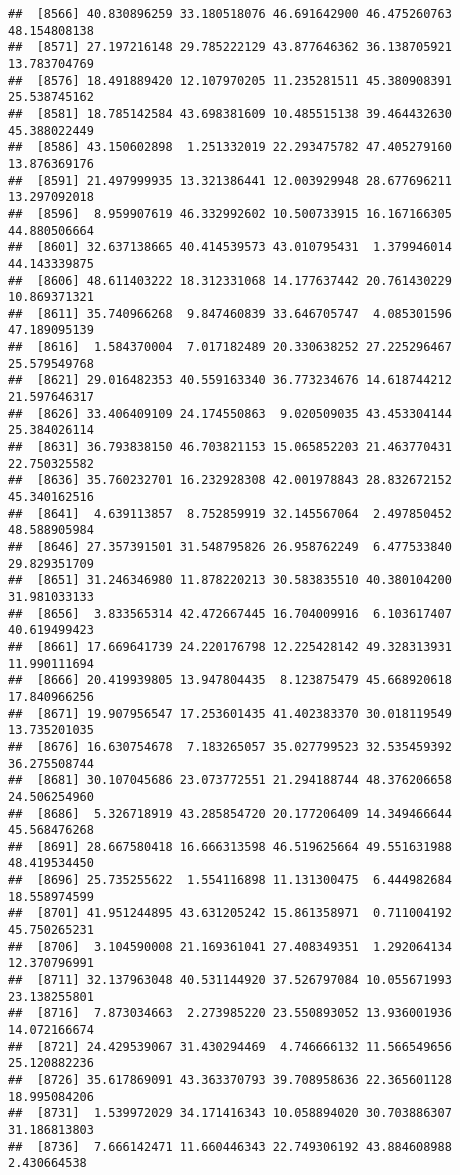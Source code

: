 \documentclass[
]{article}
\begin{document}
\begin{verbatim}
##  [8566] 40.830896259 33.180518076 46.691642900 46.475260763 48.154808138
##  [8571] 27.197216148 29.785222129 43.877646362 36.138705921 13.783704769
##  [8576] 18.491889420 12.107970205 11.235281511 45.380908391 25.538745162
##  [8581] 18.785142584 43.698381609 10.485515138 39.464432630 45.388022449
##  [8586] 43.150602898  1.251332019 22.293475782 47.405279160 13.876369176
##  [8591] 21.497999935 13.321386441 12.003929948 28.677696211 13.297092018
##  [8596]  8.959907619 46.332992602 10.500733915 16.167166305 44.880506664
##  [8601] 32.637138665 40.414539573 43.010795431  1.379946014 44.143339875
##  [8606] 48.611403222 18.312331068 14.177637442 20.761430229 10.869371321
##  [8611] 35.740966268  9.847460839 33.646705747  4.085301596 47.189095139
##  [8616]  1.584370004  7.017182489 20.330638252 27.225296467 25.579549768
##  [8621] 29.016482353 40.559163340 36.773234676 14.618744212 21.597646317
##  [8626] 33.406409109 24.174550863  9.020509035 43.453304144 25.384026114
##  [8631] 36.793838150 46.703821153 15.065852203 21.463770431 22.750325582
##  [8636] 35.760232701 16.232928308 42.001978843 28.832672152 45.340162516
##  [8641]  4.639113857  8.752859919 32.145567064  2.497850452 48.588905984
##  [8646] 27.357391501 31.548795826 26.958762249  6.477533840 29.829351709
##  [8651] 31.246346980 11.878220213 30.583835510 40.380104200 31.981033133
##  [8656]  3.833565314 42.472667445 16.704009916  6.103617407 40.619499423
##  [8661] 17.669641739 24.220176798 12.225428142 49.328313931 11.990111694
##  [8666] 20.419939805 13.947804435  8.123875479 45.668920618 17.840966256
##  [8671] 19.907956547 17.253601435 41.402383370 30.018119549 13.735201035
##  [8676] 16.630754678  7.183265057 35.027799523 32.535459392 36.275508744
##  [8681] 30.107045686 23.073772551 21.294188744 48.376206658 24.506254960
##  [8686]  5.326718919 43.285854720 20.177206409 14.349466644 45.568476268
##  [8691] 28.667580418 16.666313598 46.519625664 49.551631988 48.419534450
##  [8696] 25.735255622  1.554116898 11.131300475  6.444982684 18.558974599
##  [8701] 41.951244895 43.631205242 15.861358971  0.711004192 45.750265231
##  [8706]  3.104590008 21.169361041 27.408349351  1.292064134 12.370796991
##  [8711] 32.137963048 40.531144920 37.526797084 10.055671993 23.138255801
##  [8716]  7.873034663  2.273985220 23.550893052 13.936001936 14.072166674
##  [8721] 24.429539067 31.430294469  4.746666132 11.566549656 25.120882236
##  [8726] 35.617869091 43.363370793 39.708958636 22.365601128 18.995084206
##  [8731]  1.539972029 34.171416343 10.058894020 30.703886307 31.186813803
##  [8736]  7.666142471 11.660446343 22.749306192 43.884608988  2.430664538

\end{verbatim}
\end{document}
